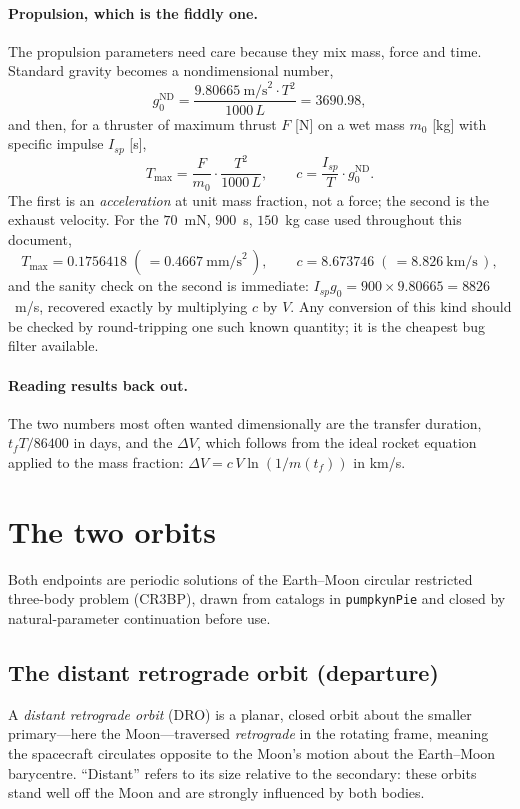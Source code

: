 \documentclass[11pt]{article}
\newcommand{\code}[1]{\texttt{#1}}
\begin{document}
\paragraph{Propulsion, which is the fiddly one.} The propulsion parameters need
care because they mix mass, force and time. Standard gravity becomes a
nondimensional number,
\[
  g_0^{\text{ND}} = \frac{9.80665~\text{m/s}^2 \cdot T^2}{1000\,L} = 3690.98 ,
\]
and then, for a thruster of maximum thrust $F$ [N] on a wet mass $m_0$ [kg] with
specific impulse $I_{sp}$ [s],
\[
  T_{\max} = \frac{F}{m_0}\cdot\frac{T^2}{1000\,L},
  \qquad
  c = \frac{I_{sp}}{T} \cdot g_0^{\text{ND}} .
\]
The first is an \emph{acceleration} at unit mass fraction, not a force; the
second is the exhaust velocity. For the $70$~mN, $900$~s, $150$~kg case used
throughout this document,
\[
  T_{\max} = 0.1756418 \;(\,= 0.4667~\text{mm/s}^2\,),
  \qquad
  c = 8.673746 \;(\,= 8.826~\text{km/s}\,),
\]
and the sanity check on the second is immediate: $I_{sp}g_0 = 900 \times 9.80665
= 8826$~m/s, recovered exactly by multiplying $c$ by $V$. Any conversion of this
kind should be checked by round-tripping one such known quantity; it is the
cheapest bug filter available.

\paragraph{Reading results back out.} The two numbers most often wanted
dimensionally are the transfer duration, $t_f T / 86400$ in days, and the
$\Delta V$, which follows from the ideal rocket equation applied to the mass
fraction: $\Delta V = c\,V \ln(1/m(t_f))$ in km/s.

\section{The two orbits}

Both endpoints are periodic solutions of the Earth--Moon circular restricted
three-body problem (CR3BP), drawn from catalogs in \code{pumpkynPie} and closed
by natural-parameter continuation before use.

\subsection{The distant retrograde orbit (departure)}

A \emph{distant retrograde orbit} (DRO) is a planar, closed orbit about the
smaller primary---here the Moon---traversed \emph{retrograde} in the rotating
frame, meaning the spacecraft circulates opposite to the Moon's motion about the
Earth--Moon barycentre. ``Distant'' refers to its size relative to the secondary:
these orbits stand well off the Moon and are strongly influenced by both bodies.
\end{document}

